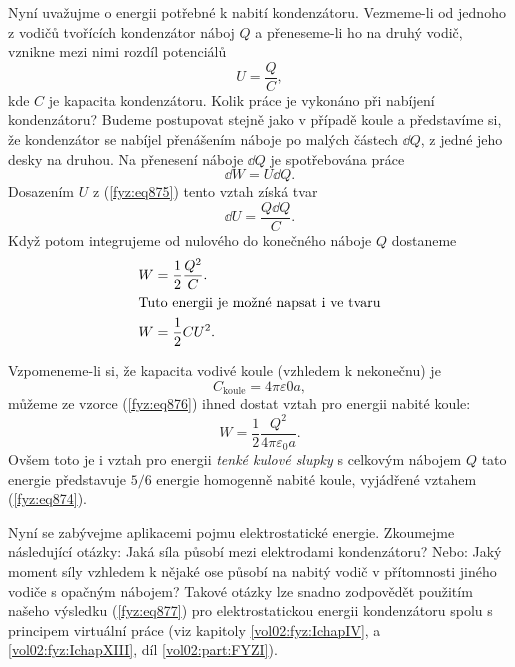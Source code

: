     Nyní uvažujme o energii potřebné k nabití kondenzátoru. Vezmeme-li od jednoho z vodičů tvořících
    kondenzátor náboj \(Q\) a přeneseme-li ho na druhý vodič, vznikne mezi nimi rozdíl potenciálů
    \begin{equation}\label{fyz:eq875}
      U = \dfrac{Q}{C},
    \end{equation}
    kde \(C\) je kapacita kondenzátoru. Kolik práce je vykonáno při nabíjení kondenzátoru? Budeme
    postupovat stejně jako v případě koule a představíme si, že kondenzátor se nabíjel přenášením
    náboje po malých částech \(\dd{Q}\), z jedné jeho desky na druhou. Na přenesení náboje
    \(\dd{Q}\) je spotřebována práce
    \begin{equation*}
      \dd{W} = U\dd{Q}.
    \end{equation*}
    Dosazením \(U\) z (\ref{fyz:eq875}) tento vztah získá tvar
    \begin{equation*}
      \dd{U} = \dfrac{Q\dd{Q}}{C}.
    \end{equation*}
    Když potom integrujeme od nulového do konečného náboje \(Q\) dostaneme
    \begin{align}
      W &= \dfrac{1}{2}\dfrac{Q^2}{C}.  \label{fyz:eq876}     \\
      \shortintertext{Tuto energii je možné napsat i ve tvaru}
      W &= \dfrac{1}{2}CU^2.            \label{fyz:eq877}
    \end{align} 

    Vzpomeneme-li si, že kapacita vodivé koule (vzhledem k nekonečnu) je
    \begin{equation*}
      C_{\text{koule}} = 4π\varepsilon0a,
    \end{equation*}
    můžeme ze vzorce (\ref{fyz:eq876}) ihned dostat vztah pro energii nabité koule:
    \begin{equation}\label{fyz:eq878}
      W=\dfrac{1}{2}\dfrac{Q^2}{4π\varepsilon_0a}.
    \end{equation}
    Ovšem toto je i vztah pro energii \emph{tenké kulové slupky} s celkovým nábojem \(Q\) tato
    energie představuje \(5/6\) energie homogenně nabité koule, vyjádřené vztahem (\ref{fyz:eq874}).

    Nyní se zabývejme aplikacemi pojmu elektrostatické energie. Zkoumejme následující otázky: Jaká
    síla působí mezi elektrodami kondenzátoru? Nebo: Jaký moment síly vzhledem k nějaké ose působí
    na nabitý vodič v přítomnosti jiného vodiče s opačným nábojem? Takové otázky lze snadno
    zodpovědět použitím našeho výsledku (\ref{fyz:eq877}) pro elektrostatickou energii kondenzátoru
    spolu s principem virtuální práce (viz kapitoly \ref{vol02:fyz:IchapIV}, a \ref{vol02:fyz:IchapXIII},
    díl \ref{vol02:part:FYZI}).

